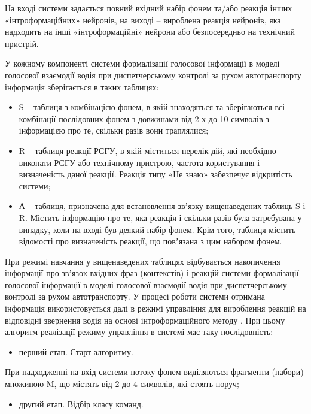 На вході системи задається повний вхідний набір фонем та/або реакція інших «інтроформаційних» нейронів, на виході – вироблена реакція нейронів, яка надходить на інші «інтроформаційні» нейрони або безпосередньо на технічний пристрій.

У кожному компоненті системи формалізації голосової інформації в моделі голосової взаємодії водія при диспетчерському контролі за рухом автотранспорту інформація зберігається в таких таблицях:

\begin{itemize}
	\item S – таблиця з комбінацією фонем, в якій знаходяться та зберігаються всі комбінації послідовних фонем з довжинами від 2-х до 10 символів з інформацією про те, скільки разів вони траплялися;
	\item R – таблиця реакції РСГУ, в якій міститься перелік дій, які необхідно виконати РСГУ або технічному пристрою, частота користування і визначеність даної реакції. Реакція типу «Не знаю» забезпечує відкритість системи;
	\item А – таблиця, призначена для встановлення звʼязку вищенаведених таблиць S і R. Містить інформацію про те, яка реакція і скільки разів була затребувана у випадку, коли на вході був деякий набір фонем. Крім того, таблиця містить відомості про визначеність реакції, що повʼязана з цим набором фонем.
\end{itemize}

При режимі навчання у вищенаведених таблицях відбувається накопичення інформації про звʼязок вхідних фраз (контекстів) і реакцій системи формалізації голосової інформації в моделі голосової взаємодії водія при диспетчерському контролі за рухом автотранспорту. У процесі роботи системи отримана інформація використовується далі в режимі управління для вироблення реакцій на відповідні звернення водія на основі інтроформаційного методу \cite{Teslia_2010}. При цьому алгоритм реалізації режиму управління в системі має таку послідовність:

\begin{itemize}
	\item перший етап. Старт алгоритму.
\end{itemize}

При надходженні на вхід системи потоку фонем виділяються фрагменти (набори) множиною M, що містять від 2 до 4 символів, які стоять поруч;

\begin{itemize}
	\item другий етап. Відбір класу команд.
\end{itemize}

